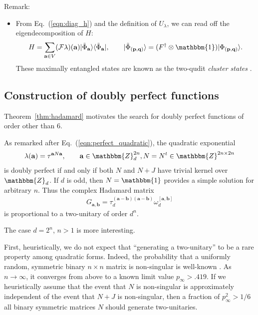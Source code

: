 \documentclass[aps,nofootinbib,floatfix,a4paper]{revtex4}
\newcommand{\1}{\mbox{$\mathbf{1}$}}
\def\ZZ{\mathbbm{Z}}
\def\F{\mathcal{F}}
\def\Id{\mathbbm{1}}
\renewcommand{\vec}{\mathbf}
\begin{document}
Remark:
\begin{itemize}
	\item
	From Eq.~(\ref{eqn:diag_h}) and the definition of $U_\lambda$, we can read off the eigendecomposition of $H$:
	\begin{align}\label{eqn:h_eigen}
		H =
		\sum_{\vec a\in V}
		(\F \lambda)(\vec a)
		|\tilde\Phi_{\vec a}\rangle \langle\tilde\Phi_{\vec a}|,
		\qquad
		|\tilde\Phi_{(\vec p, \vec q)}\rangle 
		= (F^\dagger\otimes\Id) |\Phi_{(\vec p, \vec q)}\rangle
			.
	\end{align}
	These maximally entangled states are known as the two-qudit \emph{cluster states} \cite{briegel2001persistent, zhou2003quantum}.
\end{itemize}

\subsection{Construction of doubly perfect functions}

Theorem~\ref{thm:hadamard} motivates the search for doubly perfect functions of order other than $6$.

As remarked after Eq.~(\ref{eqn:perfect_quadratic}), the quadratic exponential
\begin{align*}
	\lambda(\vec a) = \tau^{\vec a N \vec a}, \qquad \vec a \in \ZZ_d^{2n}, N=N^t \in \ZZ^{2n\times 2n} 
\end{align*}
is doubly perfect if and only if both $N$ and $N+J$ have trivial kernel over $\ZZ_d$.
If $d$ is odd, then $N=\Id$ provides a simple solution for arbitrary $n$.
Thus the complex Hadamard matrix
\begin{align*}
	G_{\vec a, \vec b}
	=
	\tau_d^{(\vec a - \vec b) (\vec a - \vec b)} \omega_d^{[\vec a, \vec b]}
\end{align*}
is proportional to a two-unitary of order $d^{n}$.
%
%

The case $d=2^n$, $n>1$ is more interesting.

First, heuristically, we do not expect that ``generating a two-unitary''  to be a rare property among quadratic forms.
Indeed, the probability that a uniformly random, symmetric binary $n\times n$ matrix is non-singular is well-known \cite{brent2010determinant}.
As $n\to\infty$, it converges from above to a known limit value $p_\infty>.419$.
If we heuristically assume that the event that $N$ is non-singular is 
approximately independent
of the event that $N+J$ is non-singular,
then a fraction of $p_\infty^2 > 1/6$ all binary symmetric matrices $N$ should generate two-unitaries.
\end{document}

